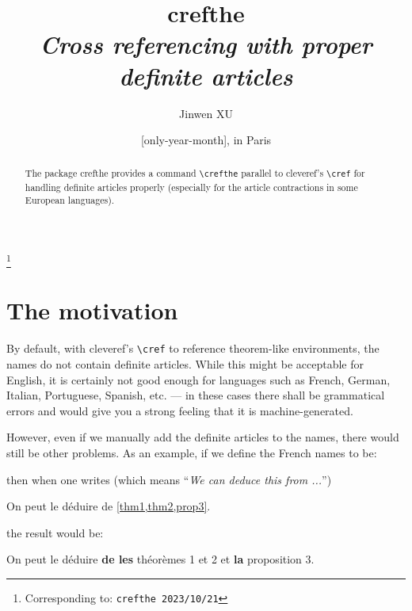 \documentclass[classical]{einfart}
\newenvironment{demo}
  {%
    \LocallyStopLineNumbers%
    \begin{tcolorbox}[enhanced jigsaw,pad at break*=1mm,breakable,
        left=2.5mm,right=3mm,top=0.5mm,bottom=0mm,
        colback=gray!5!paper,boxrule=0pt,frame hidden,
        borderline west={1.2mm}{0mm}{gray!55!paper},arc=.7mm]%
  }
  {%
    \end{tcolorbox}%
    \ResumeLineNumbers%
  }
\newcommand{\crefthepackage}{\textsf{crefthe}}
\begin{document}
\def\PackageVersion{2023/10/21}
\def\PackageSubVersion{}

\title{\crefthepackage{}\\\smallskip\itshape Cross referencing with proper definite articles}
\author{Jinwen XU}
\thanks{Corresponding to: \texttt{\crefthepackage{} \PackageVersion\PackageSubVersion}}
\date{\TheDate{\PackageVersion}[only-year-month], in Paris}

\maketitle

\begin{abstract}
    \raggedleft
    The package \crefthepackage{} provides a command \lstinline|\crefthe| parallel to \textsf{cleveref}'s \lstinline|\cref| for handling definite articles properly (especially for the article contractions in some European languages).
\end{abstract}

\section{The motivation}

By default, with \textsf{cleveref}'s \lstinline|\cref| to reference theorem-like environments, the names do not contain definite articles. While this might be acceptable for English, it is certainly not good enough for languages such as French, German, Italian, Portuguese, Spanish, etc. --- in these cases there shall be grammatical errors and would give you a strong feeling that it is machine-generated.

However, even if we manually add the definite articles to the names, there would still be other problems. As an example, if we define the French names to be:

\begin{code}
\end{code}

then when one writes (which means ``\emph{We can deduce this from ...}'')

\begin{code}
On peut le déduire de \cref{thm1,thm2,prop3}.
\end{code}

the result would be:

\begin{demo}
    On peut le déduire \textbf{de les} théorèmes 1 et 2 et \textbf{la} proposition 3.
\end{demo}
\end{document}
